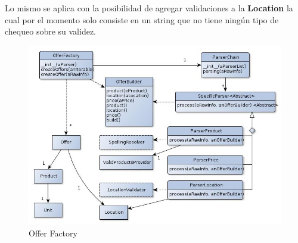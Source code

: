 \documentclass[10pt, a4paper]{article}
\begin{document}
Lo mismo se aplica con la posibilidad de agregar validaciones a la \textbf{Location} la cual por el momento solo consiste en un string que no tiene ningún tipo de chequeo sobre su validez.\\ 



\begin{figure}[H]
\centering
\includegraphics[scale=0.65]{graphics/parser_class.jpg}
\caption{Offer Factory}
\end{figure}
\end{document}
